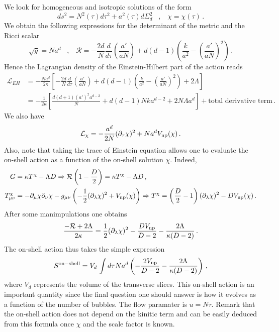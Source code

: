 \documentclass[a4paper]{article}
\def\sp{\;\;\;,\;\;\;}
\begin{document}
We look for homogeneous and isotropic solutions of the form
\begin{equation}
  ds^2= N^2(\tau)d\tau^2 + a^2(\tau) d \Sigma_{d}^2\sp \chi=\chi(\tau)\,.
\end{equation}
We obtain the following expressions for the determinant of the metric and the Ricci scalar
\begin{equation}
  \sqrt{g}=N a^d\sp \mathcal{R}=-\frac{2d}{N} \frac{d}{d\tau}\left(\frac{a'}{aN}\right)+d(d-1)\left(\frac{k}{a^2}-\left(\frac{a'}{aN}\right)^2\right)\,.
\end{equation}
Hence the Lagrangian density of the Einstein-Hilbert part of the action reads
\begin{equation}
  \begin{aligned}
    \mathcal{L}_{EH} &= -\frac{N a^d}{2\kappa}\left[-\frac{2d}{N} \frac{d}{d\tau}\left(\frac{a'}{aN}\right)+d(d-1)\left(\frac{k}{a^2}-\left(\frac{a'}{aN}\right)^2\right)+2\Lambda\right]\\
    &= -\frac{1}{2\kappa}\left[\frac{d(d+1)(a')^2 a^{d-2}}{N} + d(d-1) N k a^{d-2} + 2 N \Lambda a^{d}\right] + \text{total derivative term}\,.
  \end{aligned}
\end{equation}
We also have
\begin{equation}
  \mathcal{L}_{\chi}=-\frac{a^d}{2N}(\partial_\tau \chi)^2 + N a^{d} V_{\rm np}(\chi)\,.
\end{equation}
Also, note that taking the trace of Einstein equation allows one to evaluate the on-shell action as a function of the on-shell solution $\chi$. Indeed,
\begin{equation}
\begin{aligned}
  G &= \kappa T^{\chi} - \Lambda D \Rightarrow \mathcal{R}\left(1-\frac{D}{2}\right)=\kappa T^{\chi} - \Lambda D\,,\\
  T_{\mu \nu}^{\chi}&= -\partial_\mu \chi \partial_\nu \chi -g_{\mu\nu}\left(-\frac{1}{2}(\partial_\lambda \chi)^2+V_{\rm np}(\chi)\right) \Rightarrow T^{\chi}=\left(\frac{D}{2}-1\right)(\partial_\lambda \chi)^2 - D V_{\rm np}(\chi)\,.
\end{aligned}
\end{equation}
After some manimpulations one obtains
\begin{equation}
  \frac{-\mathcal{R}+2\Lambda}{2\kappa}=\frac{1}{2}(\partial_\lambda \chi)^2-\frac{DV_{\rm np}}{D-2}-\frac{2\Lambda}{\kappa(D-2)}\,.
\end{equation}
The on-shell action thus takes the simple expression
\begin{equation}
  S^{\rm on-shell} = V_{d}\,\int d\tau N a^{d}\left(-\frac{2V_{\rm np}}{D-2}-\frac{2\Lambda}{\kappa(D-2)}\right)\,,
\end{equation}
where $V_d$ represents the volume of the transverse slices. This on-shell action is an important quantity since the final question one should answer is how it evolves as a function of the number of bubbles. The flow paramater is $u= N \tau$. Remark that the on-shell action does not depend on the kinitic term and can be easily deduced from this formula once $\chi$ and the scale factor is known. 
\end{document}
